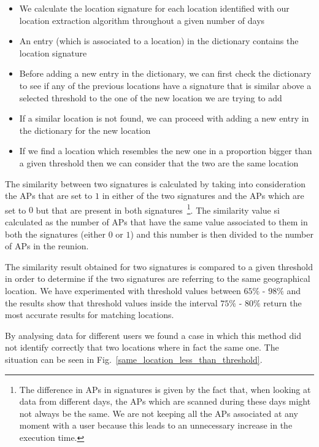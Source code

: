\begin{itemize}
  \item We calculate the location signature for each location identified with
  our location extraction algorithm throughout a given number of days
  \item An entry (which is associated to a location) in the dictionary contains
  the location signature
  \item Before adding a new entry in the dictionary, we can first
  check the dictionary to see if any of the previous locations have a signature
  that is similar above a selected threshold to the one of the new location we
  are trying to add
  \item If a similar location is not found, we can proceed with adding a new
  entry in the dictionary for the new location
  \item If we find a location which resembles the new one in a proportion bigger
  than a given threshold then we can consider that the two are the same
  location
\end{itemize}

The similarity between two signatures is calculated by taking into consideration
the APs that are set to $1$ in either of the two signatures and the APs which
are set to $0$ but that are present in both signatures~\footnote{The difference
in APs in signatures is given by the fact that, when looking at data from
different days, the APs which are scanned during these days might not always be
the same. We are not keeping all the APs associated at any moment with a user
because this leads to an unnecessary increase in the execution time.}. The
similarity value si calculated as the number of APs that have the same value
associated to them in both the signatures (either $0$ or $1$) and this number is
then divided to the number of APs in the reunion.

The similarity result obtained for two signatures is compared to a given
threshold in order to determine if the two signatures are referring to the
same geographical location. We have experimented with threshold values between
$65\%$ - $98\%$ and the results show that threshold values inside the
interval $75\%$ - $80\%$ return the most accurate results for matching
locations.

By analysing data for different users we found a case in which this method did
not identify correctly that two locations where in fact the same one. The
situation can be seen in Fig.~\ref{same_location_less_than_threshold}.

